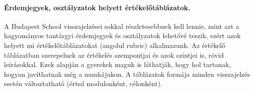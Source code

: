 \paragraph{Érdemjegyek, osztályzatok helyett értékelőtáblázatok.} A Budapest School visszajelzései sokkal részletesebbnek kell lennie, mint azt a hagyományos tantárgyi érdemjegyek és osztályzatok lehetővé teszik, ezért azok helyett mi értékelőtáblázatokat (angolul rubric) alkalmazunk. Az értékelő táblázatban szerepelnek az értékelés szempontjai és azok szintjei is, rövid leírásokkal. Ezek alapján a gyerekek maguk is láthatják, hogy hol tartanak, hogyan javíthatnak még a munkájukon. A táblázatok formája minden visszajelzés esetén változtatható (értsd modulonként, célonként). 
